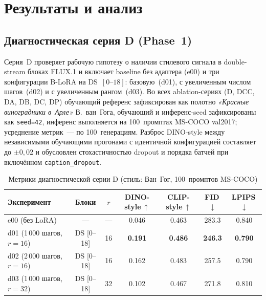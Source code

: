 
\section{Результаты и анализ}
\label{sec:results}

\subsection{Диагностическая серия D (Phase~1)}
\label{sec:results_phase1}

Серия~D проверяет рабочую гипотезу о наличии стилевого сигнала в double-stream блоках FLUX.1 и включает baseline без адаптера (e00) и три конфигурации B-LoRA на DS~$[0\text{--}18]$: базовую~(d01), с увеличенным числом шагов~(d02) и с увеличенным рангом~(d03). Во всех ablation-сериях (D, DCC, DA, DB, DC, DP) обучающий референс зафиксирован как полотно \textit{«Красные виноградники в~Арле»} В.~ван~Гога, обучающий и инференс-seed зафиксированы как \texttt{seed=42}, инференс выполняется на 100~промптах MS-COCO val2017; усреднение метрик~--- по 100~генерациям. Разброс DINO-style между независимыми обучающими прогонами с идентичной конфигурацией составляет до $\pm 0{,}02$ и обусловлен стохастичностью dropout и порядка батчей при включённом \texttt{caption\_dropout}.

\begin{table}[h]
\centering
\caption{Метрики диагностической серии D (стиль: Ван~Гог, 100~промптов MS-COCO)}
\label{tab:phase1_metrics}
\begingroup\small
\begin{tabular}{lcccccc}
\hline
\textbf{Эксперимент} & \textbf{Блоки} & \textbf{$r$} & \textbf{DINO-style\,$\uparrow$} & \textbf{CLIP-style\,$\uparrow$} & \textbf{FID\,$\downarrow$} & \textbf{LPIPS\,$\downarrow$} \\
\hline
e00 (без LoRA)           & —           & — & 0.046          & 0.463          & 283.3          & 0.840          \\
d01 (1\,000 шагов, $r{=}16$) & DS [0–18] & 16 & \textbf{0.191} & \textbf{0.486} & \textbf{246.3} & \textbf{0.790} \\
d02 (2\,000 шагов, $r{=}16$) & DS [0–18] & 16 & 0.162          & 0.483          & 257.5          & 0.790          \\
d03 (1\,000 шагов, $r{=}32$) & DS [0–18] & 32 & 0.102          & 0.467          & 271.8          & 0.810          \\
\hline
\end{tabular}\endgroup
\end{table}

